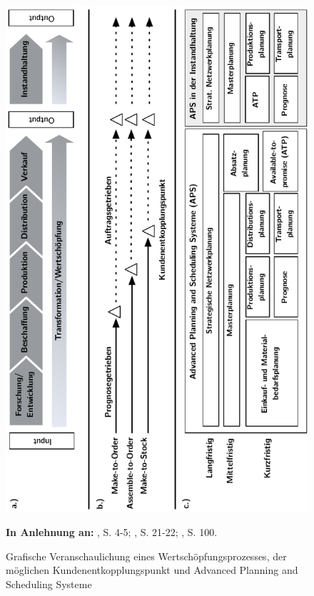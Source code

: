 \begin{figure}[h!]
  \begin{center}
    \includegraphics[width=120mm]{Bilder/prozess.pdf}
    \caption{Grafische Veranschaulichung eines Wertschöpfungsprozesses, der möglichen Kundenentkopplungspunkt und Advanced Planning and Scheduling Systeme}  \label{Prozess}
    {\footnotesize \textbf{In Anlehnung an:} \cite{Bach:2012aa}, S. 4-5; \cite{quante2009management}, S. 21-22; \cite{meyr2015structure}, S. 100.}
  \end{center}
\end{figure}

